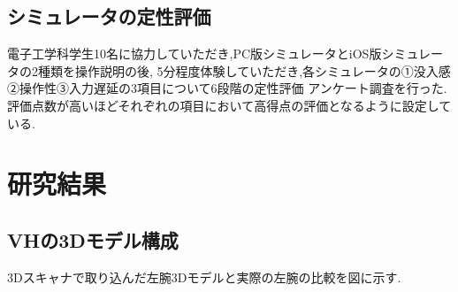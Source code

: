 \documentclass{ltjsreport}
\begin{document}
		
	\section{シミュレータの定性評価}
		電子工学科学生10名に協力していただき,PC版シミュレータとiOS版シミュレータの2種類を操作説明の後,
		5分程度体験していただき,各シミュレータの①没入感②操作性③入力遅延の3項目について6段階の定性評価
		アンケート調査を行った.評価点数が高いほどそれぞれの項目において高得点の評価となるように設定している.

\chapter{研究結果}
	
	\section{VHの3Dモデル構成}
		3Dスキャナで取り込んだ左腕3Dモデルと実際の左腕の比較を図に示す.
\end{document}

